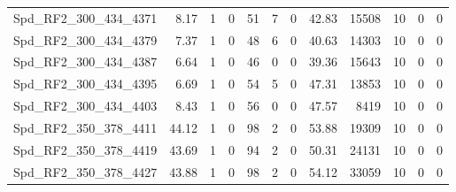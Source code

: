 \begin{longtable}[c]{@{}lrrrrrrrrrrr@{}}
Spd\_RF2\_300\_434\_4371     & 8.17                   & 1                       & 0                       & 51                     & 7                       & 0                       & 42.83                   & 15508                    & 10                       & 0                        & 0                        \\
Spd\_RF2\_300\_434\_4379     & 7.37                   & 1                       & 0                       & 48                     & 6                       & 0                       & 40.63                   & 14303                    & 10                       & 0                        & 0                        \\
Spd\_RF2\_300\_434\_4387     & 6.64                   & 1                       & 0                       & 46                     & 0                       & 0                       & 39.36                   & 15643                    & 10                       & 0                        & 0                        \\
Spd\_RF2\_300\_434\_4395     & 6.69                   & 1                       & 0                       & 54                     & 5                       & 0                       & 47.31                   & 13853                    & 10                       & 0                        & 0                        \\
Spd\_RF2\_300\_434\_4403     & 8.43                   & 1                       & 0                       & 56                     & 0                       & 0                       & 47.57                   & 8419                     & 10                       & 0                        & 0                        \\
Spd\_RF2\_350\_378\_4411     & 44.12                  & 1                       & 0                       & 98                     & 2                       & 0                       & 53.88                   & 19309                    & 10                       & 0                        & 0                        \\
Spd\_RF2\_350\_378\_4419     & 43.69                  & 1                       & 0                       & 94                     & 2                       & 0                       & 50.31                   & 24131                    & 10                       & 0                        & 0                        \\
Spd\_RF2\_350\_378\_4427     & 43.88                  & 1                       & 0                       & 98                     & 2                       & 0                       & 54.12                   & 33059                    & 10                       & 0                        & 0                        \\

\end{longtable}
